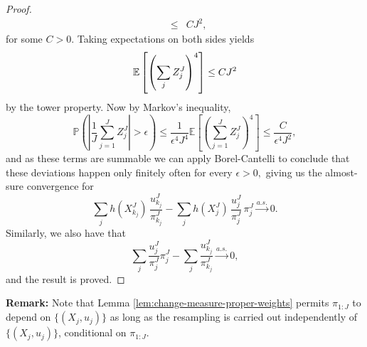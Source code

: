\begin{proof}
\begin{eqnarray}
    &\leq& CJ^2,
    \end{eqnarray}
    for some $C>0$. 
    Taking expectations on both sides yields
    \begin{equation}\mathbb{E}\left[\left(\sum_j Z_j^J\right)^4 \right]  \leq CJ^2\end{equation}
    by the tower property. Now by Markov's inequality, 
    \begin{equation}\mathbb{P}\left(\left|\frac{1}{J} \sum_{j=1}^J Z_j^J\right|>\epsilon \right) 
    \leq \frac{1}{\epsilon^4J^4 } 
    \mathbb{E}\left[\left(\sum_{j=1}^J Z_j^J\right)^4\right] \leq \frac{C}{\epsilon^4J^2},\end{equation}
    and as these terms are summable we can apply Borel-Cantelli to conclude that these deviations happen only finitely often for every $\epsilon>0,$ giving us the almost-sure convergence for   
    \begin{equation} 
    \sum_j h(X_{k_j}^J)\, \frac{u_{k_j}^J}{\pi_{k_j}^J}
    -  \sum_j h(X_j^J)\, \frac{u_j^J}{\pi_j^J}\, \pi_j^J \stackrel{a.s.}{\to} 0.
    \end{equation} 
    Similarly, we also have that
    \begin{equation} 
    \sum_j \frac{u_j^J}{\pi_j^J}\pi_j^J
    - \sum_j \frac{u_{k_j}^J}{\pi_{k_j}^J} \stackrel{a.s.}{\to} 0,
    \end{equation}
    and the result is proved. 

    
    
\end{proof}


\noindent \textbf{Remark:} Note that Lemma \ref{lem:change-measure-proper-weights} permits $\pi_{1:J}$ to depend on $\{(X_j,u_j)\}$ as long as the resampling is carried out independently of $\{(X_j,u_j)\}$, conditional on $\pi_{1:J}$.

